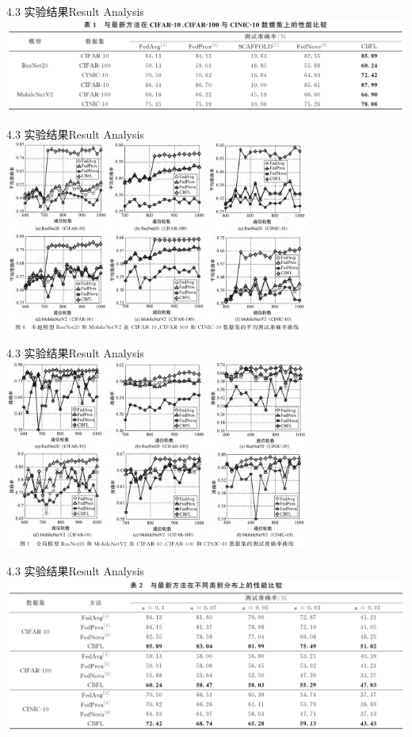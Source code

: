 \documentclass{sintefbeamer}
\theoremstyle{definition}
\begin{document}
\begin{frame}{4.3 实验结果}{Result Analysis}
	\includegraphics[width=1.\textwidth]{images/img_expr2}
\end{frame}

\begin{frame}{4.3 实验结果}{Result Analysis}
	\includegraphics[width=0.75\textwidth]{images/img_expr1}
\end{frame}

\begin{frame}{4.3 实验结果}{Result Analysis}
	\includegraphics[width=0.75\textwidth]{images/img_expr3}
\end{frame}


\begin{frame}{4.3 实验结果}{Result Analysis}
	\includegraphics[width=1.\textwidth]{images/img_expr4}
\end{frame}
\end{document}
